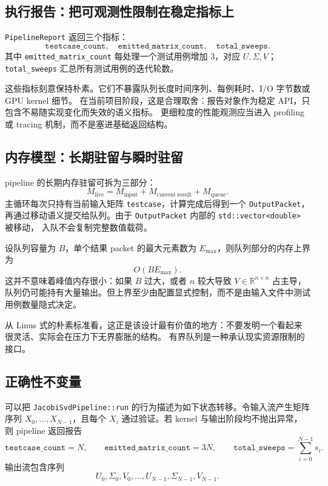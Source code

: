 \subsection{执行报告：把可观测性限制在稳定指标上}

\texttt{PipelineReport} 返回三个指标：
\[
    \texttt{testcase\_count},\quad
    \texttt{emitted\_matrix\_count},\quad
    \texttt{total\_sweeps}.
\]
其中 \texttt{emitted\_matrix\_count} 每处理一个测试用例增加 $3$，对应 $U,\Sigma,V$；
\texttt{total\_sweeps} 汇总所有测试用例的迭代轮数。

这些指标刻意保持朴素。它们不暴露队列长度时间序列、每例耗时、I/O 字节数或 GPU kernel 细节。
在当前项目阶段，这是合理取舍：报告对象作为稳定 API，只包含不易随实现变化而失效的语义指标。
更细粒度的性能观测应当进入 profiling 或 tracing 机制，而不是塞进基础返回结构。

\subsection{内存模型：长期驻留与瞬时驻留}

pipeline 的长期内存驻留可拆为三部分：
\[
    M_{\mathrm{live}}
    =
    M_{\mathrm{input}}
    +
    M_{\mathrm{current\ result}}
    +
    M_{\mathrm{queue}}.
\]
主循环每次只持有当前输入矩阵 \texttt{testcase}，计算完成后得到一个 \texttt{OutputPacket}，
再通过移动语义提交给队列。由于 \texttt{OutputPacket} 内部的 \texttt{std::vector<double>} 被移动，
入队不会复制完整数值载荷。

设队列容量为 $B$，单个结果 packet 的最大元素数为 $E_{\max}$，则队列部分的内存上界为
\[
    O(BE_{\max}).
\]
这并不意味着峰值内存很小：如果 $B$ 过大，或者 $n$ 较大导致 $V\in\mathbb{R}^{n\times n}$ 占主导，
队列仍可能持有大量输出。但上界至少由配置显式控制，而不是由输入文件中测试用例数量隐式决定。

从 Linus 式的朴素标准看，这正是该设计最有价值的地方：不要发明一个看起来很灵活、实际会在压力下无界膨胀的结构。
有界队列是一种承认现实资源限制的接口。

\subsection{正确性不变量}

可以把 \texttt{JacobiSvdPipeline::run} 的行为描述为如下状态转移。令输入流产生矩阵序列
$X_0,\ldots,X_{N-1}$，且每个 $X_i$ 通过验证。若 kernel 与输出阶段均不抛出异常，则 pipeline 返回报告
\[
    \texttt{testcase\_count}=N,
    \qquad
    \texttt{emitted\_matrix\_count}=3N,
    \qquad
    \texttt{total\_sweeps}=\sum_{i=0}^{N-1}s_i.
\]
输出流包含序列
\[
    U_0,\Sigma_0,V_0,\ldots,U_{N-1},\Sigma_{N-1},V_{N-1}.
\]

